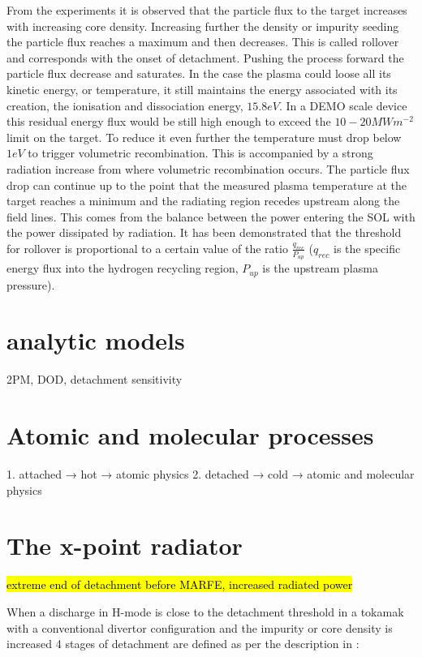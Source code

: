 From the experiments it is observed that the particle flux to the target increases with increasing core density. Increasing further the density or impurity seeding the particle flux reaches a maximum and then decreases. This is called rollover and corresponds with the onset of detachment. Pushing the process forward the particle flux decrease and saturates. In the case the plasma could loose all its kinetic energy, or temperature, it still maintains the energy associated with its creation, the ionisation and dissociation energy, $15.8eV$. In a DEMO scale device this residual energy flux would be still high enough to exceed the $10-20 MWm^{-2}$ limit on the target. \cite{Krasheninnikov2017a} To reduce it even further the temperature must drop below $1eV$ to trigger volumetric recombination. This is accompanied by a strong radiation increase from where volumetric recombination occurs. The particle flux drop can continue up to the point that the measured plasma temperature at the target reaches a minimum and the radiating region recedes upstream along the field lines. This comes from the balance between the power entering the SOL with the power dissipated by radiation. It has been demonstrated that the threshold for rollover is proportional to a certain value of the ratio $ \frac {q_{rec}} {P_{up}}$ ($q_{rec}$ is the speciﬁc energy ﬂux into the hydrogen recycling region, $P_{up}$ is the upstream plasma pressure). \cite{Krasheninnikov1999,Krasheninnikov2016}


\section{analytic models}
2PM, DOD, detachment sensitivity
\section{Atomic and molecular processes}
            1. attached → hot → atomic physics
            2. detached → cold → atomic and molecular physics
\section{The x-point radiator}
\hl{extreme end of detachment before MARFE, increased radiated power}

When a discharge in H-mode is close to the detachment threshold in a tokamak with a conventional divertor configuration and the impurity or core density is increased 4 stages of detachment are defined as per the description in \cite{Reimold2015}:

